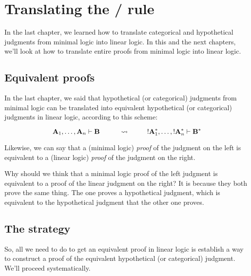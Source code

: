 \documentclass[../../../main.tex]{subfiles}
\begin{document}
\chapter{Translating the \startrule/ rule}

In the last chapter, we learned how to translate categorical and hypothetical judgments from minimal logic into linear logic. In this and the next chapters, we'll look at how to translate entire proofs from minimal logic into linear logic.


\section{Equivalent proofs}

In the last chapter, we said that hypothetical (or categorical) judgments from minimal logic can be translated into equivalent hypothetical (or categorical) judgments in linear logic, according to this scheme:

\begin{equation*}
  \nd{A}_{1}, \ldots, \nd{A}_{n} \ndturnstile/ \nd{B}
  \hskip 1cm \rightsquigarrow \hskip 1cm
  \bang/\nd{A}_{1}^{*}, \ldots, \bang/\nd{A}_{n}^{*} \ndturnstile/ \nd{B}^{*}
\end{equation*}

\noindent
Likewise, we can say that a (minimal logic) \emph{proof} of the judgment on the left is equivalent to a (linear logic) \emph{proof} of the judgment on the right. 

Why should we think that a minimal logic proof of the left judgment is equivalent to a proof of the linear judgment on the right? It is because they both prove the same thing. The one proves a hypothetical judgment, which is equivalent to the hypothetical judgment that the other one proves.


\section{The strategy}

So, all we need to do to get an equivalent proof in linear logic is establish a way to construct a proof of the equivalent hypothetical (or categorical) judgment. We'll proceed systematically. 
\end{document}

